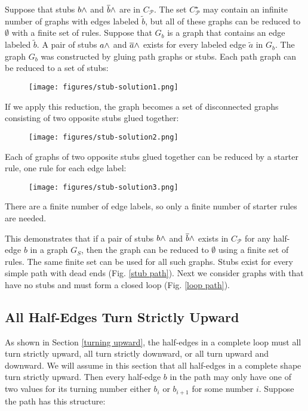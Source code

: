 \documentclass[acmtog]{acmart}
\begin{document}
Suppose that stubs $b {\wedge}$ and $\overline{b} {\wedge}$ are in $C_{\mathcal{P}}$. The set
$C^{\star}_{\mathcal{P}}$ may contain an infinite number of graphs with edges
labeled $\tilde{b}$, but all of these graphs can be reduced to $\emptyset$ with
a finite set of rules. Suppose that $G_b$ is a graph that contains an edge
labeled $\tilde{b}$. A pair of stubs $a {\wedge}$ and $\overline{a} {\wedge}$ exists for every
labeled edge $\tilde{a}$ in $G_b$. The graph $G_b$ was constructed by gluing
path graphs or stubs. Each path graph can be reduced to a set of stubs:

\begin{figure}[H]
\centering
\texttt{[image: figures/stub-solution1.png]}
\end{figure}

If we apply this reduction, the graph becomes a set of disconnected graphs consisting
of two opposite stubs glued together:

\begin{figure}[H]
\centering
\texttt{[image: figures/stub-solution2.png]}
\end{figure}

Each of graphs of two opposite stubs glued together can be reduced by a starter
rule, one rule for each edge label:

\begin{figure}[H]
\centering
\texttt{[image: figures/stub-solution3.png]}
\end{figure}

\noindent There are a finite number of edge labels, so only a finite number of starter rules are needed.

This demonstrates that if a pair of stubs $b {\wedge}$ and $\overline{b} {\wedge}$ exists in
$C_{\mathcal{P}}$ for any half-edge $b$ in a graph $G_S$, then the graph can be reduced to
$\emptyset$ using a finite set of rules. The same finite set can be used for all
such graphs. Stubs exist for every simple path with dead ends (Fig.
\ref{stub path}). Next we consider graphs with that have no stubs
and must form a closed loop (Fig. \ref{loop path}).

\subsection{All Half-Edges Turn Strictly Upward}
\label{Strictly upward}

As shown in Section \ref{turning upward}, the half-edges in a complete loop must
all turn strictly upward, all turn strictly downward, or all turn upward and
downward. We will assume in this section that all half-edges in a complete shape
turn strictly upward. Then every half-edge $b$ in the path may only have one of
two values for its turning number either $b_i$ or $b_{i+1}$ for some number $i$.
Suppose the path has this structure:
\end{document}
